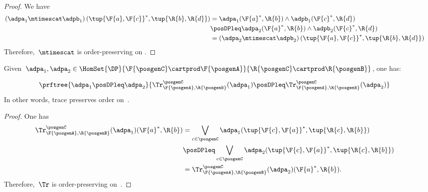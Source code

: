 \begin{proof}
    We have
    \begin{equation}
        \label{eq:tens_pres_ord}
        \begin{aligned}
            \left( \adpa_1\mtimescat \adpb_1\right) (\tup{\F{a},\F{c}}^*,\tup{\R{b},\R{d}})&=\adpa_1(\F{a}^*,\R{b})\wedge \adpb_1(\F{c}^*,\R{d})\\
            &\posDPleq \adpa_2(\F{a}^*,\R{b})\wedge \adpb_2(\F{c}^*,\R{d})\\
            &=\left( \adpa_2\mtimescat \adpb_2\right) (\tup{\F{a},\F{c}}^*,\tup{\R{b},\R{d}})
        \end{aligned}
    \end{equation}
    Therefore,~$\mtimescat$ is order-preserving on \DP.
\end{proof}

\begin{lemma}
    \label{lem:trace_pres_order}
    Given~$\adpa_1,\adpa_2\in \HomSet{\DP}{\F{\posgenC}\cartprod \F{\posgenA}}{\R{\posgenC}\cartprod \R{\posgenB}}$, one has:

    \begin{equation}
        \prftree{\adpa_1\posDPleq \adpa_2}{\Tr_{\F{\posgenA},\R{\posgenB}}^\posgenC(\adpa_1)\posDPleq \Tr_{\F{\posgenA},\R{\posgenB}}^\posgenC(\adpa_2)}
    \end{equation}
    In other words, trace preserves order on~\DP.
\end{lemma}

\begin{proof}
    One has
    \begin{equation}
        \label{eq:trace_pres_ord}
        \begin{aligned}
            \Tr_{\F{\posgenA},\R{\posgenB}}^\posgenC(\adpa_1)(\F{a}^*,\R{b})&=\bigvee_{c\in \posgenC}\adpa_1(\tup{\F{c},\F{a}}^*,\tup{\R{c},\R{b}})\\
            &\posDPleq \bigvee_{c\in \posgenC}\adpa_2(\tup{\F{c},\F{a}}^*,\tup{\R{c},\R{b}})\\
            &=\Tr_{\F{\posgenA},\R{\posgenB}}^\posgenC(\adpa_2)(\F{a}^*,\R{b}).
        \end{aligned}
    \end{equation}
    Therefore,~$\Tr$ is order-preserving on~\DP.
\end{proof}

